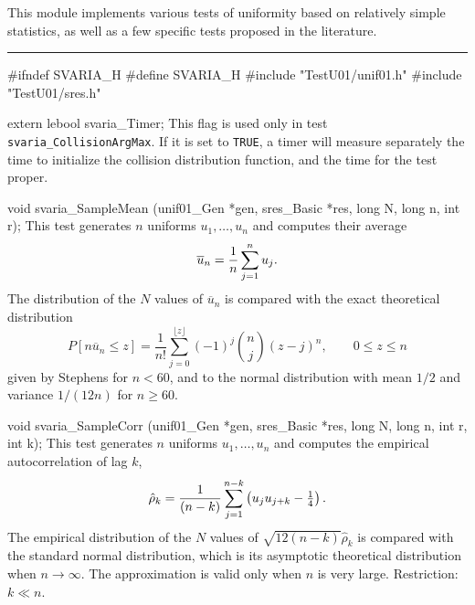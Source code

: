 
This module implements various tests of uniformity based on
relatively simple statistics, as well as a few specific tests proposed 
in the literature. \resdef


\bigskip
\hrule
\code\hide
#ifndef SVARIA_H
#define SVARIA_H
\endhide
#include "TestU01/unif01.h"
#include "TestU01/sres.h"
\endcode

\ifdetailed  %
\code


extern lebool svaria_Timer;
\endcode
 \tab
   This flag is used only in test  {\tt svaria\_CollisionArgMax}.
   If it is set to {\tt TRUE}, a timer will measure separately the time to
   initialize the collision distribution function, and the time for the
   test proper.
 \endtab

\fi   %


\code

void svaria_SampleMean (unif01_Gen *gen, sres_Basic *res,
                        long N, long n, int r);
\endcode
 \tab
   This test generates $n$ uniforms $u_1,\dots,u_n$ and computes
   their average
    $$ \overline u_n = {1\over n} \sum_{j=1}^n u_j.$$
   The distribution of the $N$ values of $\overline u_n$ is compared
   with the exact theoretical distribution
$$
   P[n \overline u_n \le z] = \frac 1 {n!}
      \sum_{j = 0}^{\lfloor z \rfloor} (-1)^j {n \choose j} (z - j)^n,
     \qquad 0 \le z \le n
$$
   given by Stephens \cite{tSTE66a}
   for $n < 60$, and to the normal distribution with mean $1/2$
   and variance $1/(12n)$ for $n\ge 60$.
 \endtab
\code


void svaria_SampleCorr (unif01_Gen *gen, sres_Basic *res,
                        long N, long n, int r, int k);
\endcode
 \tab
  This test generates $n$ uniforms $u_1,\dots,u_n$ and
   computes  
  the empirical autocorrelation \cite{sFIS78a} of lag $k$,
    $$
     \hat\rho_k = {1 \over (n-k)} \sum_{j=1}^{n-k} 
               \left(u_j u_{j+k} - {\textstyle \frac14}\right).
    $$
   The empirical distribution
   of the $N$ values of $\sqrt{12 (n-k)} \hat\rho_k$  
   is compared with the standard normal distribution,
   which is its asymptotic theoretical distribution when $n \to\infty$.
   The approximation is valid only when $n$ is very large.
   Restriction: $k \ll n$.
 \endtab
\code


